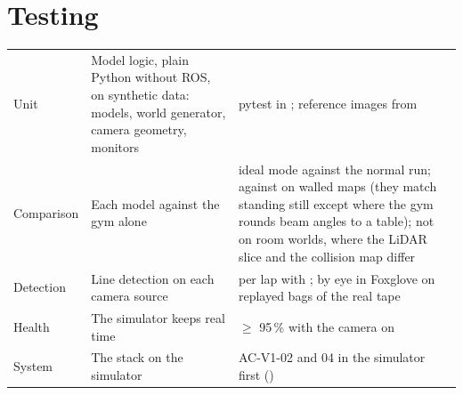\documentclass[11pt,a4paper]{article}
\begin{document}
\section{Testing}
\begin{tabularx}{\textwidth}{@{}L{3cm} L{4cm} Y@{}}
\toprule
{} &  &  \\
\midrule
Unit & Model logic, plain Python without ROS, on synthetic data: models, world generator, camera geometry, monitors & pytest in ; reference images from  \\
Comparison & Each model against the gym alone & ideal mode against the normal run;  against  on walled maps (they match standing still except where the gym rounds beam angles to a table); not on room worlds, where the LiDAR slice and the collision map differ \\
Detection & Line detection on each camera source &  per lap with ; by eye in Foxglove on replayed bags of the real tape \\
Health & The simulator keeps real time &  $\geq$ 95\,\% with the camera on \\
System & The stack on the simulator & AC-V1-02 and 04 in the simulator first () \\
\bottomrule
\end{tabularx}

\end{document}
